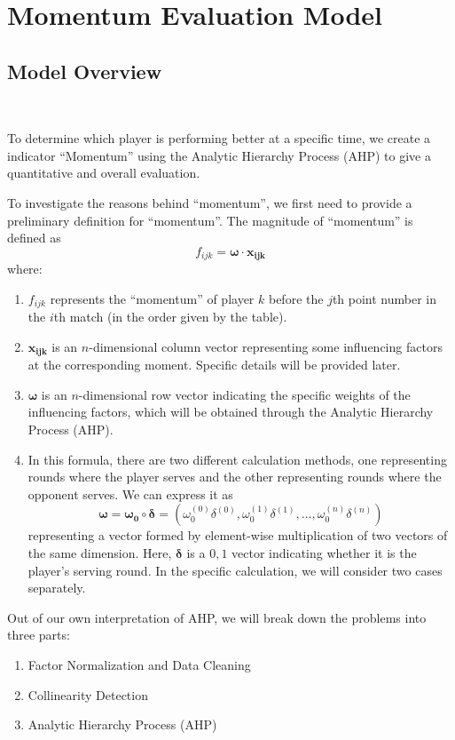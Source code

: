 \section{Momentum Evaluation Model}

\subsection{Model Overview}~{}

To determine which player is performing better at a specific time, we create a indicator ``Momentum'' 
using the Analytic Hierarchy Process (AHP) to give a quantitative and overall evaluation.

\indent To investigate the reasons behind ``momentum'', we first need to provide a preliminary definition for ``momentum''. The magnitude of ``momentum'' is defined as $$f_{ijk}=\boldsymbol{\omega}\cdot\boldsymbol{x_{ijk}}$$
where:
\begin{enumerate}
    \item $f_{ijk}$ represents the ``momentum'' of player $k$ before the $j$th point number in the $i$th match (in the order given by the table).
    \item $\boldsymbol{x_{ijk}}$ is an $n$-dimensional column vector representing some influencing factors at the corresponding moment. Specific details will be provided later.
    \item $\boldsymbol{\omega}$ is an $n$-dimensional row vector indicating the specific weights of the influencing factors, which will be obtained through the Analytic Hierarchy Process (AHP).
    \item In this formula, there are two different calculation methods, one representing rounds where the player serves and the other representing rounds where the opponent serves. We can express it as $$\boldsymbol{\omega}=\boldsymbol{\omega_0} \circ \boldsymbol{\delta}=(\omega_0^{(0)}\delta^{(0)},\omega_0^{(1)}\delta^{(1)},\dots,\omega_0^{(n)}\delta^{(n)})$$ representing a vector formed by element-wise multiplication of two vectors of the same dimension. Here, $\boldsymbol{\delta}$ is a $0,1$ vector indicating whether it is the player's serving round. In the specific calculation, we will consider two cases separately.
\end{enumerate}

Out of our own interpretation of AHP, we will break down the problems into three parts:

\begin{enumerate}
    \item Factor Normalization and Data Cleaning
    \item Collinearity Detection
    \item Analytic Hierarchy Process (AHP)
\end{enumerate}

